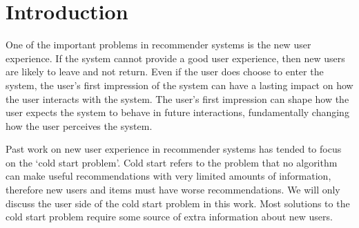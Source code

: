 \documentclass[letterpaper]{sig-alternate}
\begin{document}

\section{Introduction}

  One of the important problems in recommender systems is the new user experience.
  If the system cannot provide a good user experience, then new users are likely to leave and not return.
  Even if the user does choose to enter the system, the user's first impression of the system can have a lasting impact on how the user interacts with the system.
  The user's first impression can shape how the user expects the system to behave in future interactions, fundamentally changing how the user perceives the system.


  Past work on new user experience in recommender systems has tended to focus on the `cold start problem'.
  Cold start refers to the problem that no algorithm can make useful recommendations with very limited amounts of information, therefore new users and items must have worse recommendations.
  We will only discuss the user side of the cold start problem in this work.
  Most solutions to the cold start problem require some source of extra information about new users.
  
\end{document}
